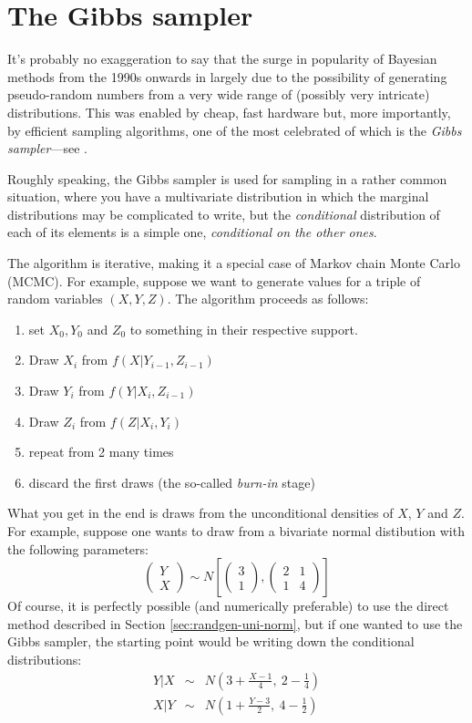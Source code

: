\section{The Gibbs sampler}
\label{sec:gibbs}

It's probably no exaggeration to say that the surge in popularity of
Bayesian methods from the 1990s onwards in largely due to the
possibility of generating pseudo-random numbers from a very wide range
of (possibly very intricate) distributions. This was enabled by cheap,
fast hardware but, more importantly, by efficient sampling
algorithms, one of the most celebrated of which is the \emph{Gibbs
  sampler}---see \cite{gelfand90,casella92}.

Roughly speaking, the Gibbs sampler is used for sampling in a rather
common situation, where you have a multivariate distribution in which
the marginal distributions may be complicated to write, but the
\emph{conditional} distribution of each of its elements is a simple
one, \emph{conditional on the other ones}.

The algorithm is iterative, making it a special case of Markov chain
Monte Carlo (MCMC). For example, suppose we want to generate values
for a triple of random variables $(X, Y, Z)$. The algorithm proceeds
as follows:
\begin{enumerate}
\item set $X_0, Y_0$ and $Z_0$ to something in their respective support.
\item Draw $X_i$ from $f(X|Y_{i-1}, Z_{i-1})$
\item Draw $Y_i$ from $f(Y|X_i, Z_{i-1})$
\item Draw $Z_i$ from $f(Z|X_i, Y_i)$
\item repeat from 2 many times
\item discard the first draws (the so-called \emph{burn-in} stage)
\end{enumerate}

What you get in the end is draws from the unconditional densities
of $X$, $Y$ and $Z$. For example, suppose one wants to draw from a
bivariate normal distibution with the following parameters:
\[
  \left( \begin{array}{c} Y \\ X \end{array} \right) \sim
  N \left[
  \left( \begin{array}{c} 3 \\ 1 \end{array} \right), 
  \left( \begin{array}{cc} 2 & 1 \\ 1 & 4 \end{array} \right)
  \right]
\]
Of course, it is perfectly possible (and numerically preferable) to
use the direct method described in Section \ref{sec:randgen-uni-norm},
but if one wanted to use the Gibbs sampler, the starting point would
be writing down the conditional distributions:
\begin{eqnarray*}
  Y|X & \sim & N\left( 3 + \frac{X-1}{4},\  2 - \frac{1}{4} \right) \\
  X|Y & \sim & N\left( 1 + \frac{Y-3}{2},\  4 - \frac{1}{2} \right)
\end{eqnarray*}

